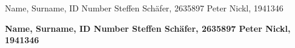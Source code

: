 \documentclass
[twoside,english,colorbacktitle,accentcolor=tud9c]
{tudexercise}
\newcommand{\studentdata}{Steffen Sch\"{a}fer, 2635897 \qquad Peter Nickl, 1941346}
\begin{document}
	
	\hwtitle{}
	\maketitle
	
	\begin{examheader}
		\normalsize
		\vspace{-1em}
		Name, Surname, ID Number \hfill \studentdata{}
		\vspace{-1em}
	\end{examheader} 
	
	\textbf{Name, Surname, ID Number \hfill \studentdata{}}

	
	
	
	
	
\end{document}

